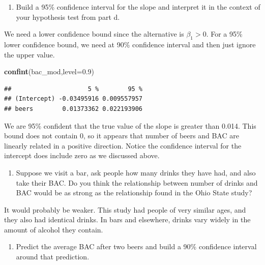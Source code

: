 \documentclass[
]{book}
\newenvironment{Shaded}{\begin{snugshade}}{\end{snugshade}}
\newcommand{\DataTypeTok}[1]{\textcolor[rgb]{0.13,0.29,0.53}{#1}}
\newcommand{\FloatTok}[1]{\textcolor[rgb]{0.00,0.00,0.81}{#1}}
\newcommand{\KeywordTok}[1]{\textcolor[rgb]{0.13,0.29,0.53}{\textbf{#1}}}
\newcommand{\NormalTok}[1]{#1}
\providecommand{\tightlist}{%
  \setlength{\itemsep}{0pt}\setlength{\parskip}{0pt}}
\begin{document}
\begin{enumerate}
\def\labelenumi{\alph{enumi}.}
\setcounter{enumi}{4}
\tightlist
\item
  Build a 95\% confidence interval for the slope and interpret it in the context of your hypothesis test from part d.~
\end{enumerate}

We need a lower confidence bound since the alternative is \(\beta_1 > 0\). For a 95\% lower confidence bound, we need at 90\% confidence interval and then just ignore the upper value.

\begin{Shaded}
\begin{Highlighting}[]
\KeywordTok{confint}\NormalTok{(bac_mod,}\DataTypeTok{level=}\FloatTok{0.9}\NormalTok{)}
\end{Highlighting}
\end{Shaded}

\begin{verbatim}
##                     5 %        95 %
## (Intercept) -0.03495916 0.009557957
## beers        0.01373362 0.022193906
\end{verbatim}

We are 95\% confident that the true value of the slope is greater than 0.014. This bound does not contain 0, so it appears that number of beers and BAC are linearly related in a positive direction. Notice the confidence interval for the intercept does include zero as we discussed above.

\begin{enumerate}
\def\labelenumi{\alph{enumi}.}
\setcounter{enumi}{5}
\tightlist
\item
  Suppose we visit a bar, ask people how many drinks they have had, and also take their BAC. Do you think the relationship between number of drinks and BAC would be as strong as the relationship found in the Ohio State study?
\end{enumerate}

It would probably be weaker. This study had people of very similar ages, and they also had identical drinks. In bars and elsewhere, drinks vary widely in the amount of alcohol they contain.

\begin{enumerate}
\def\labelenumi{\alph{enumi}.}
\setcounter{enumi}{6}
\tightlist
\item
  Predict the average BAC after two beers and build a 90\% confidence interval around that prediction.
\end{enumerate}
\end{document}
